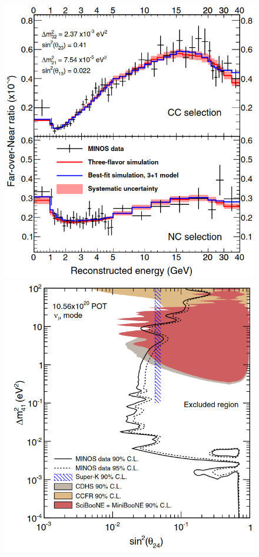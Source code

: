 \begin{figure}[h!]
    \centering
    \includegraphics[width = \smallfigwidth]{figures-chap2/minos_spectra.png}
    \includegraphics[width = \smallfigwidth]{figures-chap2/minos_contour.png}

\end{figure}

